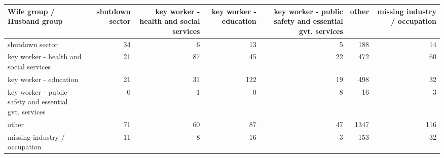 
\begin{tabular}{lrrrrrr}
\toprule
Wife group / Husband group & shutdown sector & key worker - health
 and social services & key worker - education & key worker - public safety
 and essential gvt. services & other & missing industry / occupation\\
\midrule
shutdown sector & 34 & 6 & 13 & 5 & 188 & 14\\
key worker - health
 and social services & 21 & 87 & 45 & 22 & 472 & 60\\
key worker - education & 21 & 31 & 122 & 19 & 498 & 32\\
key worker - public safety
 and essential gvt. services & 0 & 1 & 0 & 8 & 16 & 3\\
other & 71 & 60 & 87 & 47 & 1347 & 116\\
missing industry / occupation & 11 & 8 & 16 & 3 & 153 & 32\\
\bottomrule
\end{tabular}
